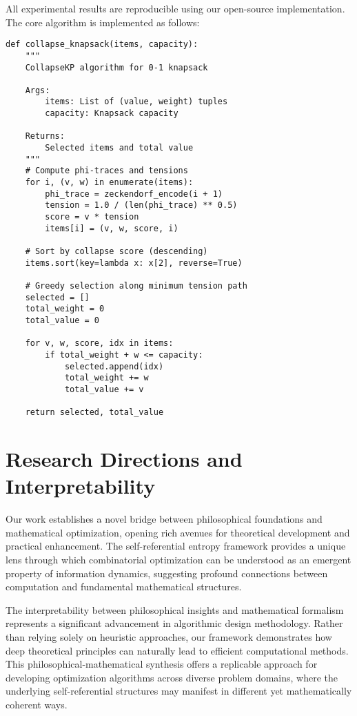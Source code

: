 \documentclass[11pt]{article}
\theoremstyle{remark}
\theoremstyle{definition}
\begin{document}
All experimental results are reproducible using our open-source implementation. The core algorithm is implemented as follows:

\begin{lstlisting}[caption=Core CollapseKP Implementation]
def collapse_knapsack(items, capacity):
    """
    CollapseKP algorithm for 0-1 knapsack
    
    Args:
        items: List of (value, weight) tuples
        capacity: Knapsack capacity
        
    Returns:
        Selected items and total value
    """
    # Compute phi-traces and tensions
    for i, (v, w) in enumerate(items):
        phi_trace = zeckendorf_encode(i + 1)
        tension = 1.0 / (len(phi_trace) ** 0.5)
        score = v * tension
        items[i] = (v, w, score, i)
    
    # Sort by collapse score (descending)
    items.sort(key=lambda x: x[2], reverse=True)
    
    # Greedy selection along minimum tension path
    selected = []
    total_weight = 0
    total_value = 0
    
    for v, w, score, idx in items:
        if total_weight + w <= capacity:
            selected.append(idx)
            total_weight += w
            total_value += v
    
    return selected, total_value
\end{lstlisting}

\section{Research Directions and Interpretability}

Our work establishes a novel bridge between philosophical foundations and mathematical optimization, opening rich avenues for theoretical development and practical enhancement. The self-referential entropy framework provides a unique lens through which combinatorial optimization can be understood as an emergent property of information dynamics, suggesting profound connections between computation and fundamental mathematical structures.

The interpretability between philosophical insights and mathematical formalism represents a significant advancement in algorithmic design methodology. Rather than relying solely on heuristic approaches, our framework demonstrates how deep theoretical principles can naturally lead to efficient computational methods. This philosophical-mathematical synthesis offers a replicable approach for developing optimization algorithms across diverse problem domains, where the underlying self-referential structures may manifest in different yet mathematically coherent ways.
\end{document}
